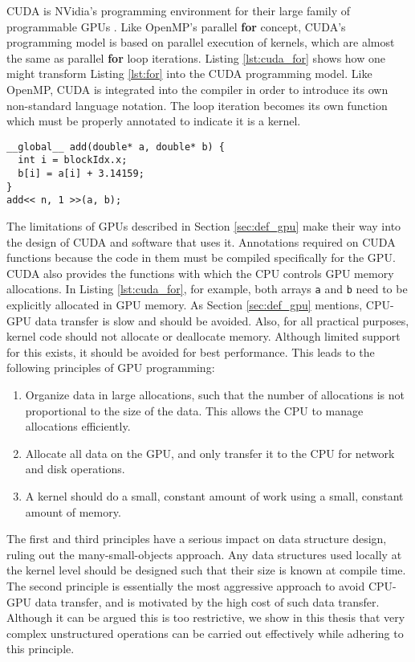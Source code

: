 CUDA is NVidia's programming environment for their large family of programmable GPUs \cite{nickolls2008scalable}.
Like OpenMP's parallel {\bf for} concept, CUDA's programming model is based on parallel execution
of kernels, which are almost the same as parallel {\bf for} loop iterations.
Listing \ref{lst:cuda_for} shows how one might transform Listing \ref{lst:for} into
the CUDA programming model.
Like OpenMP, CUDA is integrated into the compiler in order to introduce its own
non-standard language notation.
The loop iteration becomes its own function which must be properly annotated
to indicate it is a kernel.

\begin{lstlisting}[float,style=dan-style,caption=CUDA {\bf for} loop,label=lst:cuda_for]
__global__ add(double* a, double* b) {
  int i = blockIdx.x;
  b[i] = a[i] + 3.14159;
}
add<< n, 1 >>(a, b);
\end{lstlisting}

The limitations of GPUs described in Section \ref{sec:def_gpu} make their
way into the design of CUDA and software that uses it.
Annotations required on CUDA functions because the code in them
must be compiled specifically for the GPU.
CUDA also provides the functions with which the CPU controls GPU memory
allocations.
In Listing \ref{lst:cuda_for}, for example, both arrays {\tt a} and {\tt b}
need to be explicitly allocated in GPU memory.
As Section \ref{sec:def_gpu} mentions, CPU-GPU data transfer is slow and
should be avoided.
Also, for all practical purposes, kernel code should not allocate or
deallocate memory.
Although limited support for this exists, it should be avoided for best
performance.
This leads to the following principles of GPU programming:

\begin{enumerate}
\item Organize data in large allocations, such that the number of allocations
is not proportional to the size of the data. This allows the CPU to manage
allocations efficiently.
\item Allocate all data on the GPU, and only transfer it to the CPU
for network and disk operations.
\item A kernel should do a small, constant amount of work using a
small, constant amount of memory.
\end{enumerate}

The first and third principles have a serious impact on data structure
design, ruling out the many-small-objects approach.
Any data structures used locally at the kernel level should be designed such
that their size is known at compile time.
The second principle is essentially the most aggressive approach to avoid
CPU-GPU data transfer, and is motivated by the high cost of such data transfer.
Although it can be argued this is too restrictive,
we show in this thesis that very complex unstructured operations
can be carried out effectively while adhering to this principle.


